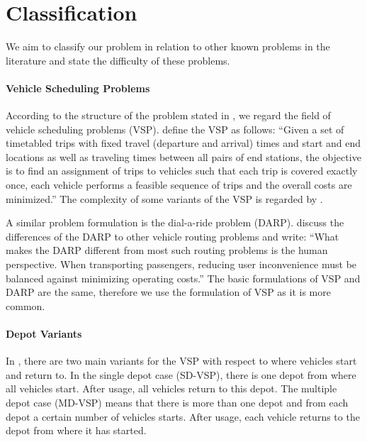 
\newpage

\section{Classification}
\label{sec:classification}

We aim to classify our problem in relation to other known problems in the literature and state the difficulty of these problems.

\paragraph{Vehicle Scheduling Problems} \parfill

According to the structure of the problem stated in , we regard the field of vehicle scheduling problems (VSP). \cite{Bunte_Kliewer} define the VSP as follows: \enquote{Given a set of timetabled trips with fixed travel (departure and arrival) times and start and end locations as well as traveling times between all pairs of end stations, the objective is to find an assignment of trips to vehicles such that each trip is covered exactly once, each vehicle performs a feasible sequence of trips and the overall costs are minimized.} The complexity of some variants of the VSP is regarded by \cite{Lenstra_Kan}.

A similar problem formulation is the dial-a-ride problem (DARP). \cite{Cordeau_Laporte} discuss the differences of the DARP to other vehicle routing problems and write: \enquote{What makes the DARP different from most such routing problems is the human perspective. When transporting passengers, reducing user inconvenience must be balanced against minimizing operating costs.} The basic formulations of VSP and DARP are the same, therefore we use the formulation of VSP as it is more common.

\paragraph{Depot Variants} \parfill 

In \cite{Bunte_Kliewer}, there are two main variants for the VSP with respect to where vehicles start and return to. In the single depot case (SD-VSP), there is one depot from where all vehicles start. After usage, all vehicles return to this depot. The multiple depot case (MD-VSP) means that there is more than one depot and from each depot a certain number of vehicles starts. After usage, each vehicle returns to the depot from where it has started. 

